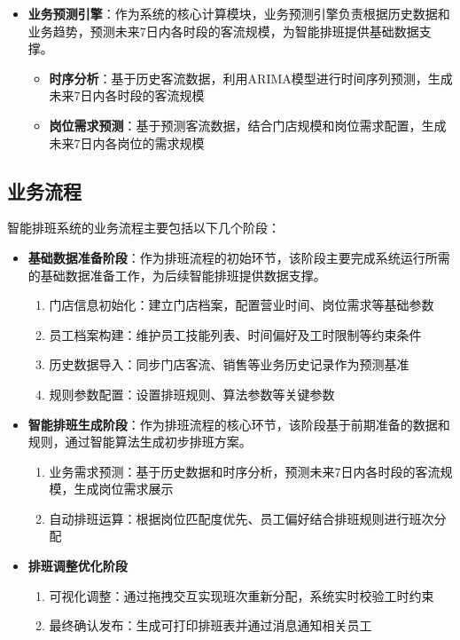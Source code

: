 \documentclass{ctexart}
\begin{document}
\begin{itemize}
    \item \textbf{业务预测引擎}：作为系统的核心计算模块，业务预测引擎负责根据历史数据和业务趋势，预测未来7日内各时段的客流规模，为智能排班提供基础数据支撑。
        \begin{itemize}
            \item \textbf{时序分析}：基于历史客流数据，利用ARIMA模型进行时间序列预测，生成未来7日内各时段的客流规模
            \item \textbf{岗位需求预测}：基于预测客流数据，结合门店规模和岗位需求配置，生成未来7日内各岗位的需求规模
        \end{itemize}
    
\end{itemize}

\subsection{业务流程}
智能排班系统的业务流程主要包括以下几个阶段：

\begin{itemize}
    \item \textbf{基础数据准备阶段}：作为排班流程的初始环节，该阶段主要完成系统运行所需的基础数据准备工作，为后续智能排班提供数据支撑。
    \begin{enumerate}
        \item 门店信息初始化：建立门店档案，配置营业时间、岗位需求等基础参数
        \item 员工档案构建：维护员工技能列表、时间偏好及工时限制等约束条件
        \item 历史数据导入：同步门店客流、销售等业务历史记录作为预测基准
        \item 规则参数配置：设置排班规则、算法参数等关键参数
    \end{enumerate}

    \item \textbf{智能排班生成阶段}：作为排班流程的核心环节，该阶段基于前期准备的数据和规则，通过智能算法生成初步排班方案。
        \begin{enumerate}
            \item 业务需求预测：基于历史数据和时序分析，预测未来7日内各时段的客流规模，生成岗位需求展示
            \item 自动排班运算：根据岗位匹配度优先、员工偏好结合排班规则进行班次分配
        \end{enumerate}

    \item \textbf{排班调整优化阶段}
    \begin{enumerate}
        \item 可视化调整：通过拖拽交互实现班次重新分配，系统实时校验工时约束
        \item 最终确认发布：生成可打印排班表并通过消息通知相关员工
    \end{enumerate}
\end{itemize}
\end{document}
